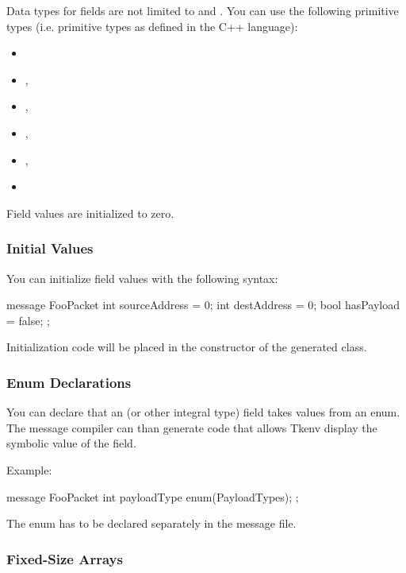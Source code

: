 Data types for fields are not limited to  and
. You can use the following primitive types (i.e. primitive
types as defined in the C++ language):

\begin{itemize}
   \item {}
   \item {}, 
   \item {}, 
   \item {}, 
   \item {}, 
   \item {}
\end{itemize}

Field values are initialized to zero.


\subsubsection{Initial Values}

You can initialize field values with the following syntax:

\begin{msg}
message FooPacket
{
    int sourceAddress = 0;
    int destAddress = 0;
    bool hasPayload = false;
};
\end{msg}

Initialization code will be placed in the constructor of the generated class.


\subsubsection{Enum Declarations}

You can declare that an  (or other integral type) field
takes values from an enum. The message compiler can than generate code
that allows Tkenv display the symbolic value of the field.

Example:

\begin{msg}
message FooPacket
{
    int payloadType enum(PayloadTypes);
};
\end{msg}

The enum has to be declared separately in the message file.


\subsubsection{Fixed-Size Arrays}

